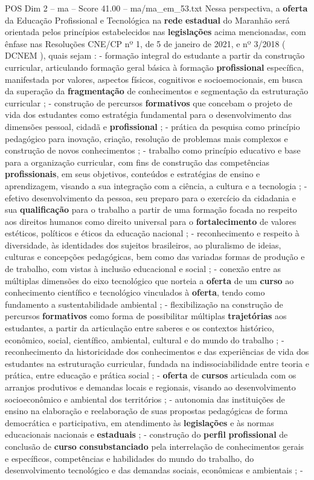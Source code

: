 \begin{textsample}{POS Dim 2 – ma – Score 41.00 – ma/ma\_em\_53.txt}
Nessa perspectiva, a \textbf{oferta} da Educação Profissional e Tecnológica na \textbf{rede} \textbf{estadual} do Maranhão será orientada pelos princípios estabelecidos nas \textbf{legislações} acima mencionadas, com ênfase nas Resoluções CNE/CP nº 1, de 5 de janeiro de 2021, e nº 3/2018 ( DCNEM ), quais sejam : - formação integral do estudante a partir da construção curricular, articulando formação geral básica à formação \textbf{profissional} específica, manifestada por valores, aspectos físicos, cognitivos e socioemocionais, em busca da superação da \textbf{fragmentação} de conhecimentos e segmentação da estruturação curricular ; - construção de percursos \textbf{formativos} que concebam o projeto de vida dos estudantes como estratégia fundamental para o desenvolvimento das dimensões pessoal, cidadã e \textbf{profissional} ; - prática da pesquisa como princípio pedagógico para inovação, criação, resolução de problemas mais complexos e construção de novos conhecimentos ; - trabalho como princípio educativo e base para a organização curricular, com fins de construção das competências \textbf{profissionais}, em seus objetivos, conteúdos e estratégias de ensino e aprendizagem, visando a sua integração com a ciência, a cultura e a tecnologia ; - efetivo desenvolvimento da pessoa, seu preparo para o exercício da cidadania e sua \textbf{qualificação} para o trabalho a partir de uma formação focada no respeito aos direitos humanos como direito universal para o \textbf{fortalecimento} de valores estéticos, políticos e éticos da educação nacional ; - reconhecimento e respeito à diversidade, às identidades dos sujeitos brasileiros, ao pluralismo de ideias, culturas e concepções pedagógicas, bem como das variadas formas de produção e de trabalho, com vistas à inclusão educacional e social ; - conexão entre as múltiplas dimensões do eixo tecnológico que norteia a \textbf{oferta} de um \textbf{curso} ao conhecimento científico e tecnológico vinculados à \textbf{oferta}, tendo como fundamento a sustentabilidade ambiental ; - flexibilização na construção de percursos \textbf{formativos} como forma de possibilitar múltiplas \textbf{trajetórias} aos estudantes, a partir da articulação entre saberes e os contextos histórico, econômico, social, científico, ambiental, cultural e do mundo do trabalho ; - reconhecimento da historicidade dos conhecimentos e das experiências de vida dos estudantes na estruturação curricular, fundada na indissociabilidade entre teoria e prática, entre educação e prática social ; - \textbf{oferta} de \textbf{cursos} articulada com os arranjos produtivos e demandas locais e regionais, visando ao desenvolvimento socioeconômico e ambiental dos territórios ; - autonomia das instituições de ensino na elaboração e reelaboração de suas propostas pedagógicas de forma democrática e participativa, em atendimento às \textbf{legislações} e às normas educacionais nacionais e \textbf{estaduais} ; - construção do \textbf{perfil} \textbf{profissional} de conclusão de \textbf{curso} \textbf{consubstanciado} pela interrelação de conhecimentos gerais e específicos, competências e habilidades do mundo do trabalho, do desenvolvimento tecnológico e das demandas sociais, econômicas e ambientais ; - 
\end{textsample}
